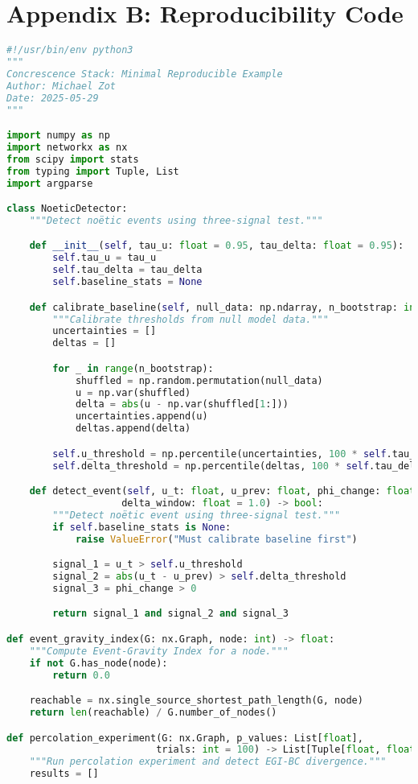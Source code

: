 \documentclass[11pt]{article}
\begin{document}
\section*{Appendix B: Reproducibility Code}
\begin{lstlisting}[language=Python]
#!/usr/bin/env python3
"""
Concrescence Stack: Minimal Reproducible Example
Author: Michael Zot
Date: 2025-05-29
"""

import numpy as np
import networkx as nx
from scipy import stats
from typing import Tuple, List
import argparse

class NoeticDetector:
    """Detect noëtic events using three-signal test."""

    def __init__(self, tau_u: float = 0.95, tau_delta: float = 0.95):
        self.tau_u = tau_u
        self.tau_delta = tau_delta
        self.baseline_stats = None

    def calibrate_baseline(self, null_data: np.ndarray, n_bootstrap: int = 1000):
        """Calibrate thresholds from null model data."""
        uncertainties = []
        deltas = []

        for _ in range(n_bootstrap):
            shuffled = np.random.permutation(null_data)
            u = np.var(shuffled)
            delta = abs(u - np.var(shuffled[1:]))
            uncertainties.append(u)
            deltas.append(delta)

        self.u_threshold = np.percentile(uncertainties, 100 * self.tau_u)
        self.delta_threshold = np.percentile(deltas, 100 * self.tau_delta)

    def detect_event(self, u_t: float, u_prev: float, phi_change: float,
                    delta_window: float = 1.0) -> bool:
        """Detect noëtic event using three-signal test."""
        if self.baseline_stats is None:
            raise ValueError("Must calibrate baseline first")

        signal_1 = u_t > self.u_threshold
        signal_2 = abs(u_t - u_prev) > self.delta_threshold
        signal_3 = phi_change > 0

        return signal_1 and signal_2 and signal_3

def event_gravity_index(G: nx.Graph, node: int) -> float:
    """Compute Event-Gravity Index for a node."""
    if not G.has_node(node):
        return 0.0

    reachable = nx.single_source_shortest_path_length(G, node)
    return len(reachable) / G.number_of_nodes()

def percolation_experiment(G: nx.Graph, p_values: List[float],
                          trials: int = 100) -> List[Tuple[float, float, float]]:
    """Run percolation experiment and detect EGI-BC divergence."""
    results = []


\end{lstlisting}
\end{document}
